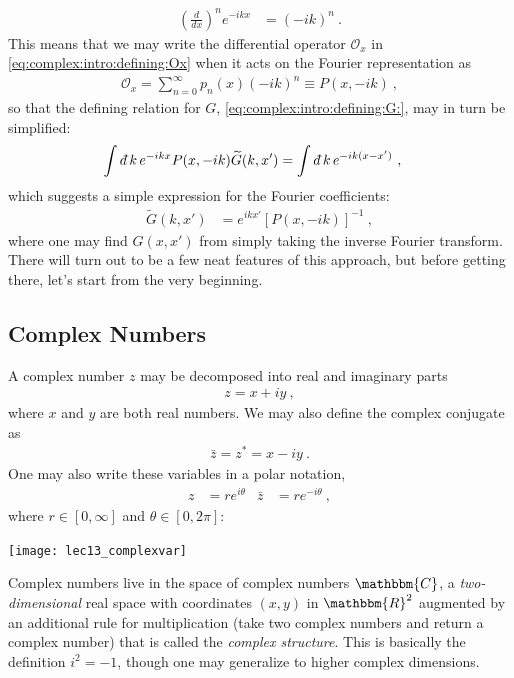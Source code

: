 \begin{align}
	\left(\frac{d}{dx}\right)^n e^{-ikx} &= (-ik)^n \ .
\end{align}
This means that we may write the differential operator $\mathcal O_x$ in \eqref{eq:complex:intro:defining:Ox} when it acts on the Fourier representation as
\begin{align}
	\mathcal O_x = \sum_{n=0}^{\infty}
	p_n(x) \left(-ik\right)^n
	\equiv P\left(x,-ik\right)  \ ,
\end{align}
so that the defining relation for $G$,
\eqref{eq:complex:intro:defining:G:}, may in turn be simplified:
\begin{align}
	\int \dbar k \, e^{-ikx} P(x, -ik) \tilde G(k,x') &= \int \dbar k \, e^{-ik(x-x')} \ ,
\end{align}
which suggests a simple expression for the Fourier coefficients:
\begin{align}
	\tilde G(k,x') &= e^{ikx'} \left[P(x,-ik)\right]^{-1} \ ,
	\label{eq:Greens:function:Fourier:transform:heuristic}
\end{align}
where one may find $G(x,x')$ from simply taking the inverse Fourier transform. There will turn out to be a few neat features of this approach, but before getting there, let's start from the very beginning.


\subsection{Complex Numbers}

A complex number $z$ may be decomposed into real and imaginary parts
\begin{align}
	z = x + i y \ ,
\end{align}
where $x$ and $y$ are both real numbers. We may also define the complex conjugate as
\begin{align}
	\bar z = z^* = x - i y \ .
\end{align}
One may also write these variables in a polar notation,
\begin{align}
	z &= re^{i\theta}
	&
	\bar z &= re^{-i\theta} \ ,
\end{align}
where $r \in [0,\infty]$ and $\theta \in [0, 2\pi]$:
\begin{center}
\texttt{[image: lec13\_complexvar]}
\end{center}
Complex numbers live in the space of complex numbers $\mathbbm{C}$, a \emph{two-dimensional} real space with coordinates $(x,y)$ in $\mathbbm{R}^2$ augmented by an additional rule for multiplication (take two complex numbers and return a complex number) that is called the \emph{complex structure}. This is basically the definition $i^2 = -1$, though one may generalize to higher complex dimensions. 


